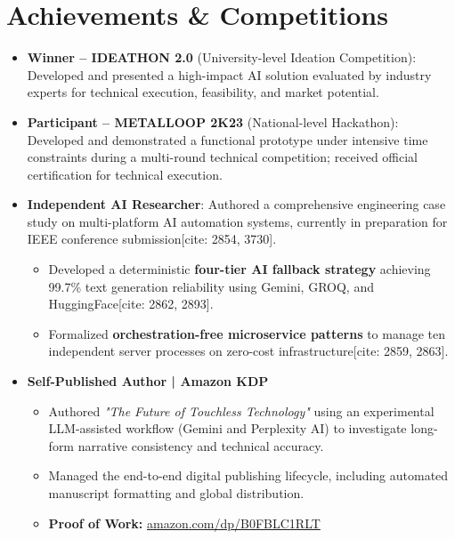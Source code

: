 \documentclass[11pt]{article}
\begin{document}
\section*{Achievements \& Competitions}
\begin{itemize}
\item \textbf{Winner -- IDEATHON 2.0} (University-level Ideation Competition): Developed and presented a high-impact AI solution evaluated by industry experts for technical execution, feasibility, and market potential.
\item \textbf{Participant -- METALLOOP 2K23} (National-level Hackathon): Developed and demonstrated a functional prototype under intensive time constraints during a multi-round technical competition; received official certification for technical execution.
\item \textbf{Independent AI Researcher}: Authored a comprehensive engineering case study on multi-platform AI automation systems, currently in preparation for IEEE conference submission[cite: 2854, 3730].
\begin{itemize}
    \item Developed a deterministic \textbf{four-tier AI fallback strategy} achieving 99.7\% text generation reliability using Gemini, GROQ, and HuggingFace[cite: 2862, 2893].
    \item Formalized \textbf{orchestration-free microservice patterns} to manage ten independent server processes on zero-cost infrastructure[cite: 2859, 2863].
\end{itemize}


\item \textbf{Self-Published Author | Amazon KDP}
\begin{itemize}
    \item Authored \textit{"The Future of Touchless Technology"} using an experimental LLM-assisted workflow (Gemini and Perplexity AI) to investigate long-form narrative consistency and technical accuracy.
    \item Managed the end-to-end digital publishing lifecycle, including automated manuscript formatting and global distribution.
    \item \textbf{Proof of Work:} \href{https://www.amazon.com/dp/B0FBLC1RLT}{amazon.com/dp/B0FBLC1RLT}
\end{itemize}
\end{itemize}

\end{document}
